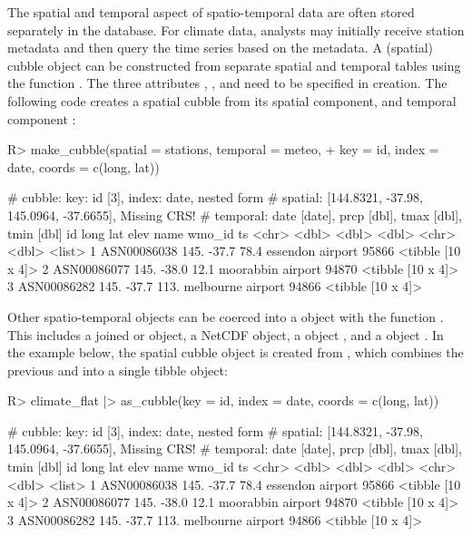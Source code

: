 \documentclass[
  shortnames]{jss}
\begin{document}
The spatial and temporal aspect of spatio-temporal data are often stored separately in the database. For climate data, analysts may initially receive station metadata and then query the time series based on the metadata. A (spatial) cubble object can be constructed from separate spatial and temporal tables using the function . The three attributes , , and  need to be specified in creation. The following code creates a spatial cubble from its spatial component,  and temporal component :

\begin{CodeChunk}
\begin{CodeInput}
R> make_cubble(spatial = stations, temporal = meteo,
+             key = id, index = date, coords = c(long, lat))
\end{CodeInput}
\begin{CodeOutput}
# cubble:   key: id [3], index: date, nested form
# spatial:  [144.8321, -37.98, 145.0964, -37.6655], Missing CRS!
# temporal: date [date], prcp [dbl], tmax [dbl], tmin [dbl]
  id           long   lat  elev name              wmo_id ts               
  <chr>       <dbl> <dbl> <dbl> <chr>              <dbl> <list>           
1 ASN00086038  145. -37.7  78.4 essendon airport   95866 <tibble [10 x 4]>
2 ASN00086077  145. -38.0  12.1 moorabbin airport  94870 <tibble [10 x 4]>
3 ASN00086282  145. -37.7 113.  melbourne airport  94866 <tibble [10 x 4]>
\end{CodeOutput}
\end{CodeChunk}

Other  spatio-temporal objects can be coerced into a  object with the function . This includes a joined  or  object, a NetCDF object, a  object \citep{stars}, and a  object \citep{sftime}. In the example below, the spatial cubble object is created from , which combines the previous  and  into a single tibble object:

\begin{CodeChunk}
\begin{CodeInput}
R> climate_flat |> as_cubble(key = id, index = date, coords = c(long, lat))
\end{CodeInput}
\begin{CodeOutput}
# cubble:   key: id [3], index: date, nested form
# spatial:  [144.8321, -37.98, 145.0964, -37.6655], Missing CRS!
# temporal: date [date], prcp [dbl], tmax [dbl], tmin [dbl]
  id           long   lat  elev name              wmo_id ts               
  <chr>       <dbl> <dbl> <dbl> <chr>              <dbl> <list>           
1 ASN00086038  145. -37.7  78.4 essendon airport   95866 <tibble [10 x 4]>
2 ASN00086077  145. -38.0  12.1 moorabbin airport  94870 <tibble [10 x 4]>
3 ASN00086282  145. -37.7 113.  melbourne airport  94866 <tibble [10 x 4]>
\end{CodeOutput}
\end{CodeChunk}
\end{document}
